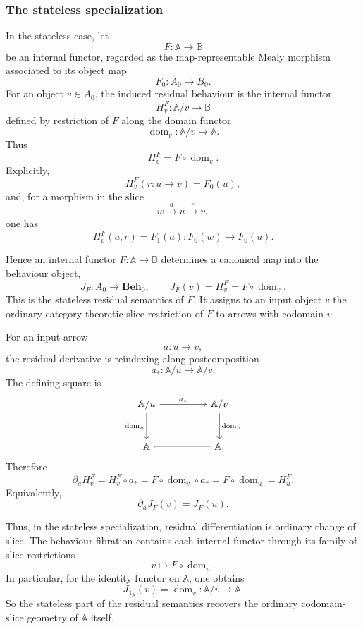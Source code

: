 \subsubsection{The stateless specialization}

In the stateless case, let
\[
    F:\mathbb A\to\mathbb B
\]
be an internal functor, regarded as the map-representable Mealy morphism
associated to its object map
\[
    F_0:A_0\to B_0.
\]
For an object \(v\in A_0\), the induced residual behaviour is the internal
functor
\[
    H^F_v:\mathbb A/v\to\mathbb B
\]
defined by restriction of \(F\) along the domain functor
\[
    \operatorname{dom}_v:\mathbb A/v\to\mathbb A.
\]
Thus
\[
    H^F_v=F\circ\operatorname{dom}_v.
\]
Explicitly,
\[
    H^F_v(r:u\to v)=F_0(u),
\]
and, for a morphism in the slice
\[
    w\xrightarrow{a}u\xrightarrow{r}v,
\]
one has
\[
    H^F_v(a,r)=F_1(a):F_0(w)\to F_0(u).
\]

Hence an internal functor \(F:\mathbb A\to\mathbb B\) determines a canonical
map into the behaviour object,
\[
    J_F:A_0\to \mathbf{Beh}_0,
    \qquad
    J_F(v)=H^F_v=F\circ\operatorname{dom}_v.
\]
This is the stateless residual semantics of \(F\). It assigns to an input object \(v\) the ordinary category-theoretic slice restriction of \(F\) to arrows with codomain \(v\).

For an input arrow
\[
    a:u\to v,
\]
the residual derivative is reindexing along postcomposition
\[
    a_*:\mathbb A/u\to\mathbb A/v.
\]
The defining square is
\[
    \begin{tikzcd}[column sep=huge, row sep=large]
            \mathbb A/u
                \arrow[r, "a_*"]
                \arrow[d, "\operatorname{dom}_u"']
        &
            \mathbb A/v
                \arrow[d, "\operatorname{dom}_v"]
        \\
            \mathbb A
                \arrow[r, equal]
        &
            \mathbb A.
    \end{tikzcd}
\]
Therefore
\[
    \partial_aH^F_v
        =
    H^F_v\circ a_*
        =
    F\circ\operatorname{dom}_v\circ a_*
        =
    F\circ\operatorname{dom}_u
        =
    H^F_u.
\]
Equivalently,
\[
    \partial_a J_F(v)=J_F(u).
\]

Thus, in the stateless specialization, residual differentiation is ordinary change of slice. The behaviour fibration contains each internal functor through its family of slice restrictions
\[
    v\longmapsto F\circ\operatorname{dom}_v.
\]
In particular, for the identity functor on \(\mathbb A\), one obtains
\[
    J_{1_{\mathbb A}}(v)=\operatorname{dom}_v:\mathbb A/v\to\mathbb A.
\]
So the stateless part of the residual semantics recovers the ordinary codomain-slice geometry of \(\mathbb A\) itself.

